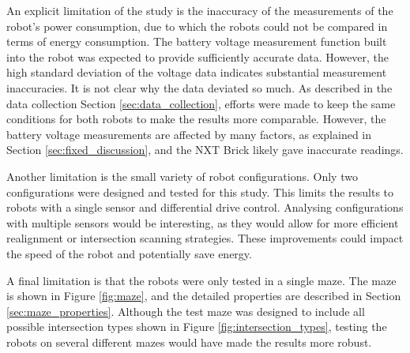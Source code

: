 An explicit limitation of the study is the inaccuracy of the measurements of the robot's power consumption, due to which the robots could not be compared in terms of energy consumption. The battery voltage measurement function built into the robot was expected to provide sufficiently accurate data. However, the high standard deviation of the voltage data indicates substantial measurement inaccuracies.
It is not clear why the data deviated so much. As described in the data collection Section \ref{sec:data_collection}, efforts were made to keep the same conditions for both robots to make the results more comparable. However, the battery voltage measurements are affected by many factors, as explained in Section \ref{sec:fixed_discussion}, and the NXT Brick likely gave inaccurate readings.

Another limitation is the small variety of robot configurations. Only two configurations were designed and tested for this study. This limits the results to robots with a single sensor and differential drive control. Analysing configurations with multiple sensors would be interesting, as they would allow for more efficient realignment or intersection scanning strategies. These improvements could impact the speed of the robot and potentially save energy.

A final limitation is that the robots were only tested in a single maze. The maze is shown in Figure \ref{fig:maze}, and the detailed properties are described in Section \ref{sec:maze_properties}.
Although the test maze was designed to include all possible intersection types shown in Figure \ref{fig:intersection_types}, testing the robots on several different mazes would have made the results more robust.